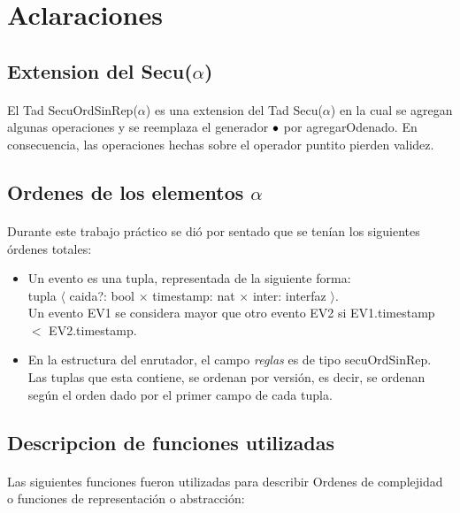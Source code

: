 \section*{Aclaraciones}

\subsection*{Extension del Secu($\alpha$)}
\paragraph{}
El Tad SecuOrdSinRep($\alpha$) es una extension del Tad Secu($\alpha$) en la cual se agregan algunas operaciones y se reemplaza el generador $\bullet$ por agregarOdenado. En consecuencia, las operaciones hechas sobre el operador puntito pierden validez.

\subsection*{Ordenes de los elementos $\alpha$}
\paragraph{}
Durante este trabajo pr\'actico se di\'o por sentado que se ten\'ian los siguientes \'ordenes totales:

\begin{itemize}
 \item Un evento es una tupla, representada de la siguiente forma: \\
tupla $\langle$ caida?: bool  $\times$ timestamp: nat $\times$ inter: interfaz  $\rangle$.\\
Un evento EV1 se considera mayor que otro evento EV2 si EV1.timestamp $<$ EV2.timestamp.
\item En la estructura del enrutador, el campo \textit{reglas} es de tipo secuOrdSinRep. Las tuplas que esta contiene, se ordenan por versi\'on, es decir, se ordenan seg\'un el orden dado por el primer campo de cada tupla.
\end{itemize}






\subsection*{Descripcion de funciones utilizadas}
\paragraph{}
Las siguientes funciones fueron utilizadas para describir Ordenes de complejidad o funciones de representaci\'on o abstracci\'on:


